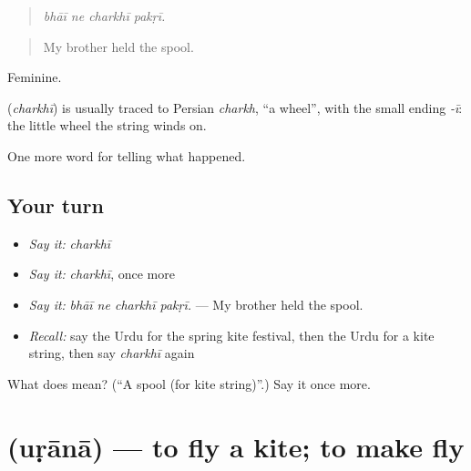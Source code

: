 \begin{quote}
   
\end{quote}

\begin{quote}
\emph{bhāī ne charkhī pakṛī.}
\end{quote}

\begin{quote}
My brother held the spool.
\end{quote}

Feminine.

\begin{cousinweb}
\textbf{} (\emph{charkhī}) is usually traced to Persian \emph{charkh}, \textquotedblleft{}a wheel\textquotedblright{}, with the small ending \emph{-ī}: the little wheel the string winds on.
\end{cousinweb}

\begin{grammarlens}[title={What you've built}]
One more word for telling what happened.
\end{grammarlens}

\subsection*{Your turn}
\begin{itemize}
\raggedright
  \item \emph{Say it:} \emph{charkhī}
  \item \emph{Say it:} \emph{charkhī}, once more
  \item \emph{Say it:} \emph{bhāī ne charkhī pakṛī.} — My brother held the spool.
  \item \emph{Recall:} say the Urdu for the spring kite festival, then the Urdu for a kite string, then say \emph{charkhī} again
\end{itemize}

\begin{tcolorbox}[breakable,colback=teal!4,colframe=teal!35!black,title={Before you move on}]
What does  mean? (\textquotedblleft{}A spool (for kite string)\textquotedblright{}.) Say it once more.
\end{tcolorbox}
\section[\texorpdfstring{\ur{اڑانا} (uṛānā)}{اڑانا (uṛānā)}]{ (uṛānā) — to fly a kite; to make fly}

\label{lesson:UR-C319-urana}



